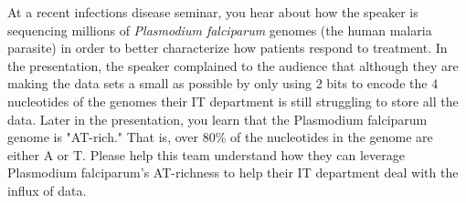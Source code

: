 \documentclass[12pt]{article}
\begin{document}
\renewcommand{\headrulewidth}{0.5pt}

\phantom{Test}

At a recent infections disease seminar, you hear about how the speaker is
sequencing millions of {\sl Plasmodium falciparum} genomes (the human malaria
parasite) in order to better characterize how patients respond to treatment. In
the presentation, the speaker complained to the audience that although they are
making the data sets a small as possible by only using 2 bits to encode the 4
nucleotides of the genomes their IT department is still struggling to store all
the data. Later in the presentation, you learn that the Plasmodium falciparum
genome is "AT-rich." That is, over 80\% of the nucleotides in the genome are
either A or T. Please help this team understand how they can leverage
Plasmodium falciparum’s AT-richness to help their IT department deal with the
influx of data.

\pagebreak

\newpage
\mbox{}
\newpage
\pagebreak
\end{document}
